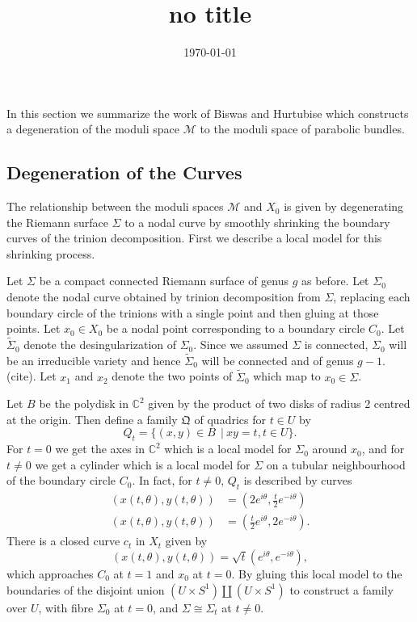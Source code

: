 \documentclass[]{article}
\title{no title}
\date{\today}
\newcommand{\C}{\mathbb{C}}
\newcommand{\MM}{\mathcal{M}}
\newcommand{\QQ}{\mathfrak{Q}}
\begin{document}
	In this section we summarize the work of Biswas and Hurtubise which constructs a degeneration of the moduli space $\MM$ to the moduli space of parabolic bundles.
\subsection{Degeneration of the Curves}
	The relationship between the moduli spaces $\MM$ and $X_0$ is given by degenerating the Riemann surface $\Sigma$ to a nodal curve by smoothly shrinking the boundary curves of the trinion decomposition. First we describe a local model for this shrinking process.
	
	Let $\Sigma$ be a compact connected Riemann surface of genus $g$ as before. Let $\Sigma_0$ denote the nodal curve obtained by trinion decomposition from $\Sigma$, replacing each boundary circle of the trinions with a single point and then gluing at those points. Let $x_0 \in X_0$ be a nodal point corresponding to a boundary circle $C_0$. Let $\tilde{\Sigma}_0$ denote the desingularization of $\Sigma_0$. Since we assumed $\Sigma$ is connected, $\Sigma_0$ will be an irreducible variety and hence $\tilde{\Sigma}_0$ will be connected and of genus $g-1$. (cite). Let $x_1$ and $x_2$ denote the two points of $\tilde{\Sigma}_0$ which map to $x_0 \in \Sigma$. 
	
	Let $B$ be the polydisk in $\C^2$ given by the product of two disks of radius 2 centred at the origin. Then define a family $\QQ$ of quadrics for $t\in U$ by 
	\begin{equation}
		Q_t = \{(x,y)\in B\ ~|~ xy = t, t\in U\}.
	\end{equation}
	For $t=0$ we get the axes in $\C^2$ which is a local model for $\Sigma_0$ around $x_0$, and for $t \neq 0$ we get a cylinder which is a local model for $\Sigma$ on a tubular neighbourhood of the boundary circle $C_0$. In fact, for $t\neq 0$, $Q_t$ is described by curves
	\begin{align*}
		(x(t,\theta), y(t, \theta)) &= \left(
		2e^{i\theta}, \frac{t}{2}e^{-i\theta}
		\right)\\
		(x(t,\theta), y(t, \theta)) &= \left(
		\frac{t}{2}e^{i\theta}, 2e^{-i\theta}
		\right).
	\end{align*}
	There is a closed curve $c_t$ in $X_t$ given by
	\begin{equation}
		(x(t,\theta), y(t,\theta)) = \sqrt{t}(e^{i\theta}, e^{-i\theta}),
	\end{equation}
	which approaches $C_0$ at $t=1$ and $x_0$ at $t=0$. By gluing this local model to the boundaries of the disjoint union $(U\times S^1)\coprod (U\times S^1)$ to construct a family over $U$, with fibre $\Sigma_0$ at $t=0$, and $\Sigma \cong \Sigma_t$ at $t\neq 0$.
\end{document}
